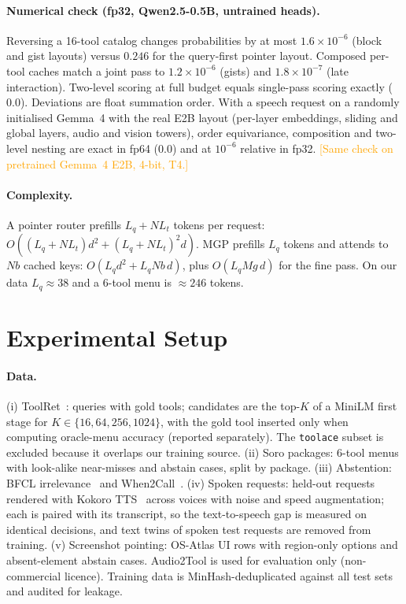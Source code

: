 \documentclass[sigconf,review,anonymous]{acmart}
\newcommand{\pending}[1]{\textcolor{orange}{[#1]}}
\newcommand{\method}{MGP}
\begin{document}
\paragraph{Numerical check (fp32, Qwen2.5-0.5B, untrained heads).} Reversing a 16-tool catalog changes probabilities by at most $1.6\times10^{-6}$ (block and gist layouts) versus $0.246$ for the query-first pointer layout. Composed per-tool caches match a joint pass to $1.2\times10^{-6}$ (gists) and $1.8\times10^{-7}$ (late interaction). Two-level scoring at full budget equals single-pass scoring exactly ($0.0$). Deviations are float summation order. With a speech request on a randomly initialised Gemma~4 with the real E2B layout (per-layer embeddings, sliding and global layers, audio and vision towers), order equivariance, composition and two-level nesting are exact in fp64 ($0.0$) and at $10^{-6}$ relative in fp32. \pending{Same check on pretrained Gemma~4 E2B, 4-bit, T4.}

\paragraph{Complexity.} A pointer router prefills $L_q + N L_t$ tokens per request: $O((L_q+NL_t)d^2 + (L_q+NL_t)^2 d)$. \method{} prefills $L_q$ tokens and attends to $Nb$ cached keys: $O(L_q d^2 + L_q N b\, d)$, plus $O(L_q M g\, d)$ for the fine pass. On our data $L_q\approx38$ and a 6-tool menu is $\approx246$ tokens.

\section{Experimental Setup}\label{sec:exp}
\paragraph{Data.} (i) ToolRet~\cite{shi2025toolret}: queries with gold tools; candidates are the top-$K$ of a MiniLM first stage for $K\in\{16,64,256,1024\}$, with the gold tool inserted only when computing oracle-menu accuracy (reported separately). The \texttt{toolace} subset is excluded because it overlaps our training source. (ii) Soro packages: 6-tool menus with look-alike near-misses and abstain cases, split by package. (iii) Abstention: BFCL irrelevance~\cite{patil2025bfcl} and When2Call~\cite{ross2025when2call}. (iv) Spoken requests: held-out requests rendered with Kokoro TTS~\cite{kokoro} across voices with noise and speed augmentation; each is paired with its transcript, so the text-to-speech gap is measured on identical decisions, and text twins of spoken test requests are removed from training. (v) Screenshot pointing: OS-Atlas UI rows with region-only options and absent-element abstain cases. Audio2Tool is used for evaluation only (non-commercial licence).
Training data is MinHash-deduplicated against all test sets and audited for leakage.
\end{document}
